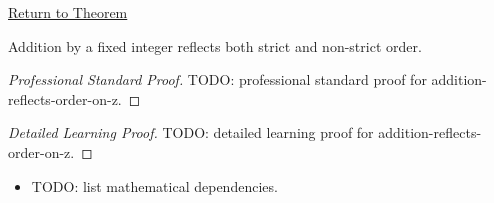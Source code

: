 \newpage
{}
\label{prf:addition-reflects-order-on-z}

\begin{remark*}[Return]
\hyperref[cor:addition-reflects-order-on-z]{Return to Theorem}
\end{remark*}

\begin{corollary*}
Addition by a fixed integer reflects both strict and non-strict order.
\end{corollary*}

\begin{proof}[Professional Standard Proof]
\LRAProofBodyStart
TODO: professional standard proof for addition-reflects-order-on-z.
\end{proof}

\begin{proof}[Detailed Learning Proof]
\LRAProofBodyStart
TODO: detailed learning proof for addition-reflects-order-on-z.
\end{proof}

\begin{remark*}
\end{remark*}

\begin{dependencies}
\begin{itemize}
  \item TODO: list mathematical dependencies.
\end{itemize}
\end{dependencies}

\clearpage
